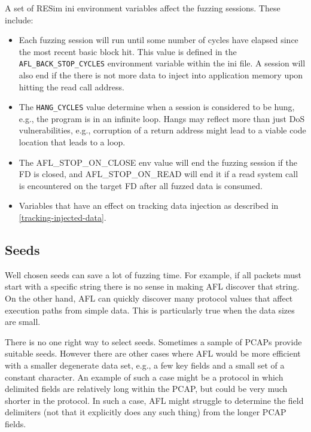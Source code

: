 \documentclass[titlepage]{article}
\begin{document}
A set of RESim ini environment variables affect the fuzzing sessions.  These include:
\begin{itemize}
\item Each fuzzing session will run until some number of cycles have elapsed since the most recent basic block hit.  This
value is defined in the {\tt AFL\_BACK\_STOP\_CYCLES} environment variable within the ini file.  A session will also end
if the there is not more data to inject into application memory upon hitting the read call address.

\item The {\tt HANG\_CYCLES} value determine when a session is considered to be hung, e.g., the program is in an infinite loop.
Hangs may reflect more than just DoS vulnerabilities, e.g., corruption of a return address might lead to a viable code location
that leads to a loop.

\item The AFL\_STOP\_ON\_CLOSE env value will end the fuzzing session if the FD is closed, and AFL\_STOP\_ON\_READ will end it if
a read system call is encountered on the target FD after all fuzzed data is consumed.

\item Variables that have an effect on tracking data injection as described in \ref{tracking-injected-data}.
\end{itemize}

\subsection{Seeds}
Well chosen seeds can save a lot of fuzzing time.  For example, if all packets must start with a specific string there is no sense in
making AFL discover that string.  On the other hand, AFL can quickly discover many protocol values that affect execution paths from simple
data.  This is particularly true when the data sizes are small.  

There is no one right way to select seeds.  Sometimes a sample of PCAPs provide suitable seeds.  However there are other cases where AFL would
be more efficient with a smaller degenerate data set, e.g., a few key fields and a small set of a constant character.  An example of such a case
might be a protocol in which delimited fields are relatively long within the PCAP, but could be very much shorter in the protocol.  In such a case,
AFL might struggle to determine the field delimiters (not that it explicitly does any such thing) from the longer PCAP fields.
\end{document}
